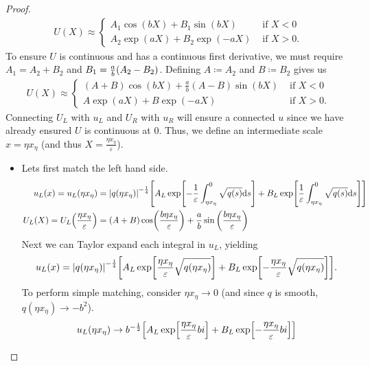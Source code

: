 \documentclass{article} %
\theoremstyle{plain}
\newcommand{\E}{\varepsilon}
\numberwithin{equation}{section} %
\numberwithin{figure}{section} %
\numberwithin{table}{section} %
\begin{document}
\begin{proof}
\begin{align*}
        U(X) \approx \begin{cases}
            A_1 \cos(bX) + B_1 \sin(bX) & \text{ if } X < 0\\
            A_2 \exp(aX) + B_2 \exp(-aX) & \text{ if } X > 0.
        \end{cases}
    \end{align*}
    To ensure $U$ is continuous and has a continuous first derivative, we must require $A_1 = A_2 + B_2$ and $B_1 = \frac{a}{b}\qty(A_2 - B_2)$.  Defining $A \coloneqq A_2$ and $B \coloneqq B_2$ gives us
    \begin{align*}
        U(X) \approx \begin{cases}
            (A + B) \cos(bX) + \frac{a}{b}(A - B) \sin(bX) & \text{ if } X < 0\\
            A \exp(aX) + B \exp(-aX) & \text{ if } X > 0.
        \end{cases}
    \end{align*}
    Connecting $U_L$ with $u_L$ and $U_R$ with $u_R$ will ensure a connected $u$ since we have already ensured $U$ is continuous at $0$.  Thus, we define an intermediate scale $x = \eta x_\eta$ (and thus $X = \frac{\eta x_\eta}{\E}$).
    \begin{itemize}
        \item
            Lets first match the left hand side.
            \begin{align*}
                u_L(x) = u_L(\eta x_\eta) &= \abs{q(\eta x_\eta)}^{-\frac{1}{4}}\qty[A_L\exp[-\frac{1}{\E}\int_{\eta x_\eta}^0 \sqrt{q(s)} \dd s] + B_L \exp[\frac{1}{\E}\int_{\eta x_\eta}^0 \sqrt{q(s)}\dd s]] \\
                U_L(X) = U_L\qty(\frac{\eta x_\eta}{\E}) &= (A + B)\cos(\frac{b\eta x_\eta}{\E}) + \frac{a}{b}\sin\qty(\frac{b\eta x_\eta}{\E})
            \end{align*}
            Next we can Taylor expand each integral in $u_L$, yielding
            \begin{align*}
                u_L(x) = \abs{q(\eta x_\eta)}^{-\frac{1}{4}}\qty[A_L\exp[\frac{\eta x_\eta}{\E}\sqrt{q(\eta x_\eta)}] + B_L\exp[-\frac{\eta x_\eta}{\E}\sqrt{q(\eta x_\eta)}]].
            \end{align*}
            To perform simple matching, consider $\eta x_\eta \rightarrow 0$ (and since $q$ is smooth, $q(\eta x_\eta) \rightarrow -b^2$).
            \begin{align*}
                u_L(\eta x_\eta) \rightarrow b^{-\frac{1}{2}}\qty[A_L \exp[\frac{\eta x_\eta}{\E}bi] + B_L \exp[-\frac{\eta x_\eta}{\E}bi]]

\end{align*}
\end{itemize}
\end{proof}
\end{document}
